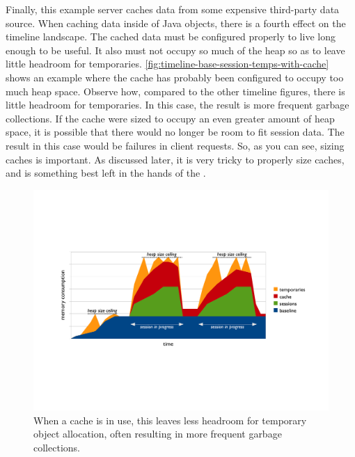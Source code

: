 Finally, this example server caches data from some expensive third-party data
source. When caching data inside of Java objects, there is a fourth effect on
the timeline landscape. The
cached data must be configured properly to live long enough to be useful. It
also must not occupy so much of the heap so as to leave little headroom for
temporaries. \autoref{fig:timeline-base-session-temps-with-cache} shows an
example where the cache has probably been configured to occupy too much heap
space. Observe how, compared to the other timeline figures, there is little
headroom for temporaries. In this case, the result is more frequent garbage
collections. If the cache were sized to occupy an even greater amount of heap
space, it is possible that there would no longer be room to fit session data.
The result in this case would be failures in client requests. So, as you can
see, sizing caches is important. As discussed later, it is very tricky to
properly size caches, and is something best left in the hands of the \jre.

\begin{figure}
	\centering
	\includegraphics[width=\textwidth]{part4/Figures/lifetime/timeline-base-session-temps-with-cache}
	\caption{When a cache is in use, this leaves less headroom for temporary
	object allocation, often resulting in more frequent garbage collections.}
	\label{fig:timeline-base-session-temps-with-cache}
\end{figure}


